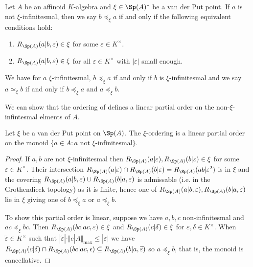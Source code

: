 \begin{definition}[$\xi$-Ordering]\label{def: xi-ordering}
    Let $A$ be an affinoid $K$-algebra and $\xi\in\Sp(A)^{*}$ be a van der Put point. If $a$ is not $\xi$-infinitesmal, then we say $b\preceq_{\xi}a$ if and only if the following equivalent conditions hold:
    \begin{enumerate}[label=(\roman*)]
        \item $R_{\Sp(A)}(a|b,\varepsilon)\in\xi$ for some $\varepsilon\in K^{\times}$. 
        \item $R_{\Sp(A)}(a|b,\varepsilon)\in\xi$ for all $\varepsilon\in K^{\times}$ with $|\varepsilon|$ small enough. 
    \end{enumerate}
\end{definition}
\begin{remark}
    We have for $a$ $\xi$-infinitesmal, $b\preceq_{\xi}a$ if and only if $b$ is $\xi$-infinitesmal and we say $a\simeq_{\xi}b$ if and only if $b\preceq_{\xi}a$ and $a\preceq_{\xi}b$. 
\end{remark}
We can show that the ordering of  defines a linear partial order on the non-$\xi$-infintesmal elments of $A$. 
\begin{proposition}\label{prop: xi-ordering is linear}
    Let $\xi$ be a van der Put point on $\Sp(A)$. The $\xi$-ordering is a linear partial order on the monoid $\{a\in A:a\text{ not }\xi\text{-infinitesmal}\}$. 
\end{proposition}
\begin{proof}
    If $a,b$ are not $\xi$-infinitesmal then $R_{\Sp(A)}(a|\varepsilon),R_{\Sp(A)}(b|\varepsilon)\in\xi$ for some $\varepsilon\in K^{\times}$. Their intersection $R_{\Sp(A)}(a|\varepsilon)\cap R_{\Sp(A)}(b|\varepsilon)=R_{\Sp(A)}(ab|\varepsilon^{2})$ is in $\xi$ and the covering $R_{\Sp(A)}(a|b,\varepsilon)\cup R_{\Sp(A)}(b|a,\varepsilon)$ is admissable (i.e. in the Grothendieck topology) as it is finite, hence one of $R_{\Sp(A)}(a|b,\varepsilon), R_{\Sp(A)}(b|a,\varepsilon)$ lie in $\xi$ giving one of $b\preceq_{\xi}a$ or $a\preceq_{\xi}b$. 

    To show this partial order is linear, suppose we have $a,b,c$ non-infinitesmal and $ac\preceq_{\xi}bc$. Then $R_{\Sp(A)}(bc|ac,\varepsilon)\in\xi$ and $R_{\Sp(A)}(c|\delta)\in\xi$ for $\varepsilon,\delta\in K^{\times}$. When $\widetilde{\varepsilon}\in K^{\times}$ such that $|\widetilde{\varepsilon}|\cdot\Vert c|A\Vert_{\max}\leq |\varepsilon|$ we have $R_{\Sp(A)}(c|\delta)\cap R_{\Sp(A)}(bc|ac,\epsilon)\subseteq R_{\Sp(A)}(b|a,\widetilde{\varepsilon})$ so $a\preceq_{\xi}b$, that is, the monoid is cancellative. 
\end{proof}
